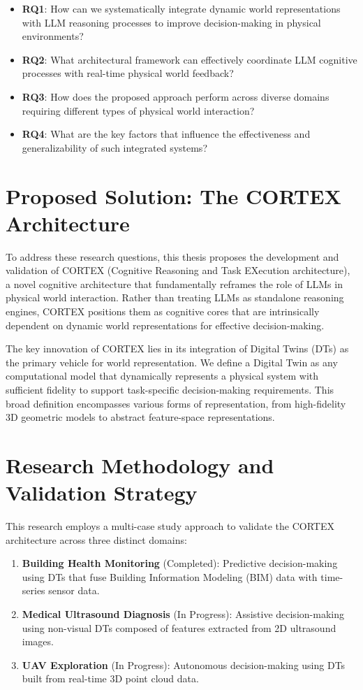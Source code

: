 \begin{itemize}
    \item \textbf{RQ1}: How can we systematically integrate dynamic world representations with LLM reasoning processes to improve decision-making in physical environments?
    \item \textbf{RQ2}: What architectural framework can effectively coordinate LLM cognitive processes with real-time physical world feedback?
    \item \textbf{RQ3}: How does the proposed approach perform across diverse domains requiring different types of physical world interaction?
    \item \textbf{RQ4}: What are the key factors that influence the effectiveness and generalizability of such integrated systems?
\end{itemize}

\section{Proposed Solution: The CORTEX Architecture}

To address these research questions, this thesis proposes the development and validation of CORTEX (Cognitive Reasoning and Task EXecution architecture), a novel cognitive architecture that fundamentally reframes the role of LLMs in physical world interaction. Rather than treating LLMs as standalone reasoning engines, CORTEX positions them as cognitive cores that are intrinsically dependent on dynamic world representations for effective decision-making.

The key innovation of CORTEX lies in its integration of Digital Twins (DTs) as the primary vehicle for world representation. We define a Digital Twin as any computational model that dynamically represents a physical system with sufficient fidelity to support task-specific decision-making requirements. This broad definition encompasses various forms of representation, from high-fidelity 3D geometric models to abstract feature-space representations.

\section{Research Methodology and Validation Strategy}

This research employs a multi-case study approach to validate the CORTEX architecture across three distinct domains:

\begin{enumerate}
    \item \textbf{Building Health Monitoring} (Completed): Predictive decision-making using DTs that fuse Building Information Modeling (BIM) data with time-series sensor data.
    \item \textbf{Medical Ultrasound Diagnosis} (In Progress): Assistive decision-making using non-visual DTs composed of features extracted from 2D ultrasound images.
    \item \textbf{UAV Exploration} (In Progress): Autonomous decision-making using DTs built from real-time 3D point cloud data.
\end{enumerate}

